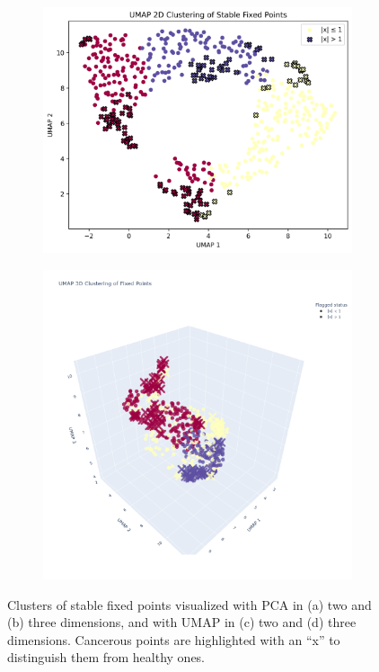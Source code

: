 \documentclass[a4paper,12pt]{article}
\begin{document}
\begin{figure}[tp]
\begin{subfigure}{0.45\textwidth}
	\caption{}
\end{subfigure}
\hfill
\begin{subfigure}{0.45\textwidth}
	\includegraphics[width=\textwidth,height=\textwidth]{stable-UMAP-2D-flagged}
	\caption{}
\end{subfigure}
\hfill
\begin{subfigure}{0.45\textwidth}
	\includegraphics[width=\textwidth,height=\textwidth]{stable-UMAP-3D-flagged}
	\caption{}
\end{subfigure}
\caption{Clusters of stable fixed points visualized with PCA in (a) two and (b) three dimensions, and with UMAP in (c) two and (d) three dimensions. Cancerous points are highlighted with an ``x'' to distinguish them from healthy ones.}
\label{fig:stable-fixed-points}
\end{figure}
\end{document}
